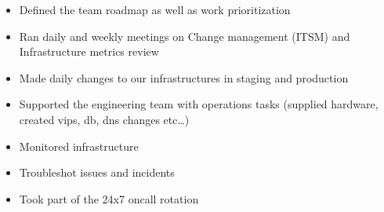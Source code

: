 \documentclass[]{friggeri-cv} %
\begin{document}
\begin{entrylist}
{\begin{itemize}
\item Defined the team roadmap as well as work prioritization
\item Ran daily and weekly meetings on Change management (ITSM) and Infrastructure metrics review 
\item Made daily changes to our infrastructures in staging and production
\item Supported the engineering team with operations tasks (supplied hardware, created vips, db, dns changes etc…)
\item Monitored infrastructure
\item Troubleshot issues and incidents 
\item Took part of the 24x7 oncall rotation
\end{itemize}}
\end{entrylist}


\newpage
\end{document}
